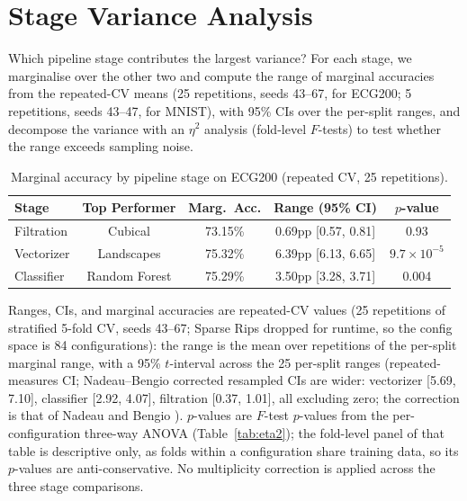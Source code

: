 \documentclass[12pt, a4paper]{report}
\theoremstyle{definition}
\theoremstyle{plain}
\theoremstyle{remark}
\begin{document}
\section{Stage Variance Analysis}
\label{sec:stage_impact}

Which pipeline stage contributes the largest variance? For each
stage, we marginalise over the other two and compute the range of
marginal accuracies from the repeated-CV means (25 repetitions,
seeds 43--67, for ECG200; 5 repetitions, seeds 43--47, for MNIST),
with 95\% CIs over the per-split ranges,
and decompose the variance with an $\eta^2$ analysis (fold-level
$F$-tests) to test whether the range exceeds sampling noise.

\begin{table}[H]
  \centering
  \caption{Marginal accuracy by pipeline stage on ECG200
  (repeated CV, 25 repetitions).}
  \label{tab:stage_impact}
  \begin{tabular}{lcccc}
    \toprule
    Stage & Top Performer & Marg.\ Acc. & Range (95\% CI) & $p$-value \\
    \midrule
    Filtration & Cubical & 73.15\% & 0.69pp [0.57, 0.81] & 0.93 \\
    Vectorizer & Landscapes & 75.32\% & 6.39pp [6.13, 6.65] & $9.7\times10^{-5}$ \\
    Classifier & Random Forest & 75.29\% & 3.50pp [3.28, 3.71] & 0.004 \\
    \bottomrule
  \end{tabular}

  \vspace{0.2cm}
  \footnotesize{Ranges, CIs, and marginal accuracies are repeated-CV
    values (25 repetitions of stratified 5-fold CV, seeds 43--67;
    Sparse Rips dropped for runtime, so the config space is 84
    configurations): the range is the mean over repetitions of the
    per-split marginal range, with a 95\% $t$-interval across the 25
    per-split ranges (repeated-measures CI; Nadeau--Bengio corrected
    resampled CIs are wider: vectorizer [5.69, 7.10], classifier
    [2.92, 4.07], filtration [0.37, 1.01], all excluding zero; the
    correction is that of Nadeau and Bengio \cite{nadeau2003}).
    $p$-values are $F$-test $p$-values from the per-configuration
    three-way ANOVA (Table~\ref{tab:eta2}); the fold-level panel of
    that table is descriptive only, as folds within a configuration share
    training data, so its $p$-values are anti-conservative. No
    multiplicity correction is applied across the three stage
    comparisons.}
\end{table}
\end{document}
